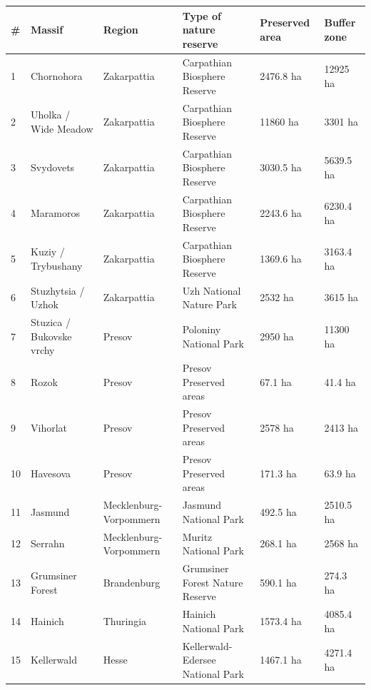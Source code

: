\documentclass{article}
\begin{document}
\begin{tabular}{llllll}
\toprule
\# & Massif & Region & Type of nature reserve & Preserved area & Buffer zone \\
\midrule
1 & Chornohora & Zakarpattia & Carpathian Biosphere Reserve & 2476.8 ha & 12925 ha \\
2 & Uholka / Wide Meadow & Zakarpattia & Carpathian Biosphere Reserve & 11860 ha & 3301 ha \\
3 & Svydovets & Zakarpattia & Carpathian Biosphere Reserve & 3030.5 ha & 5639.5 ha \\
4 & Maramoros & Zakarpattia & Carpathian Biosphere Reserve & 2243.6 ha & 6230.4 ha \\
5 & Kuziy / Trybushany & Zakarpattia & Carpathian Biosphere Reserve & 1369.6 ha & 3163.4 ha \\
6 & Stuzhytsia / Uzhok & Zakarpattia & Uzh National Nature Park & 2532 ha & 3615 ha \\
7 & Stuzica / Bukovske vrchy & Presov & Poloniny National Park & 2950 ha & 11300 ha \\
8 & Rozok & Presov & Presov Preserved areas & 67.1 ha & 41.4 ha \\
9 & Vihorlat & Presov & Presov Preserved areas & 2578 ha & 2413 ha \\
10 & Havesova & Presov & Presov Preserved areas & 171.3 ha & 63.9 ha \\
11 & Jasmund & Mecklenburg-Vorpommern & Jasmund National Park & 492.5 ha & 2510.5 ha \\
12 & Serrahn & Mecklenburg-Vorpommern & Muritz National Park & 268.1 ha & 2568 ha \\
13 & Grumsiner Forest & Brandenburg & Grumsiner Forest Nature Reserve & 590.1 ha & 274.3 ha \\
14 & Hainich & Thuringia & Hainich National Park & 1573.4 ha & 4085.4 ha \\
15 & Kellerwald & Hesse & Kellerwald-Edersee National Park & 1467.1 ha & 4271.4 ha \\
\bottomrule
\end{tabular}
\end{document}

